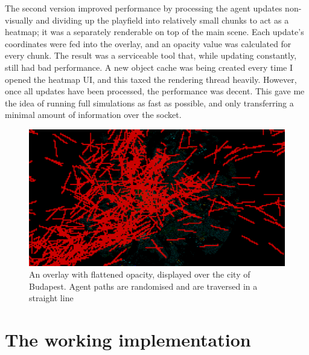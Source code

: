 The second version improved performance by processing the agent updates non-visually and dividing up the playfield into relatively small chunks to act as a heatmap; it was a separately renderable on top of the main scene. Each update's coordinates were fed into the overlay, and an opacity value was calculated for every chunk. The result was a serviceable tool that, while updating constantly, still had bad performance. A new object cache was being created every time I opened the heatmap UI, and this taxed the rendering thread heavily. However, once all updates have been processed, the performance was decent. This gave me the idea of running full simulations as fast as possible, and only transferring a minimal amount of information over the socket.
\begin{figure}[h]
    \centering
    \includegraphics[width=140mm, keepaspectratio]{images/overlay_v2.png}
    \caption{An overlay with flattened opacity, displayed over the city of Budapest. Agent paths are randomised and are traversed in a straight line\ \label{overlay_v2}}
\end{figure}

\section{The working implementation}

